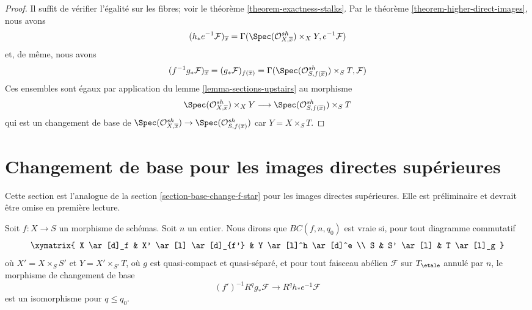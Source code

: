 \begin{proof}
Il suffit de vérifier l'égalité sur les fibres; voir le
théorème \ref{theorem-exactness-stalks}.
Par le théorème \ref{theorem-higher-direct-images}, nous avons
$$
(h_*e^{-1}\mathcal{F})_{\overline{x}} =
\Gamma(\Spec(\mathcal{O}_{X, \overline{x}}^{sh}) \times_X Y, e^{-1}\mathcal{F})
$$
et, de même, nous avons
$$
(f^{-1}g_*\mathcal{F})_{\overline{x}} =
(g_*\mathcal{F})_{f(\overline{x})} =
\Gamma(\Spec(\mathcal{O}_{S, f(\overline{x})}^{sh}) \times_S T, \mathcal{F})
$$
Ces ensembles sont égaux par application du lemme \ref{lemma-sections-upstairs}
au morphisme
$$
\Spec(\mathcal{O}_{X, \overline{x}}^{sh}) \times_X Y
\longrightarrow
\Spec(\mathcal{O}_{S, f(\overline{x})}^{sh}) \times_S T
$$
qui est un changement de base de
$\Spec(\mathcal{O}_{X, \overline{x}}^{sh}) \to
\Spec(\mathcal{O}_{S, f(\overline{x})}^{sh})$
car $Y = X \times_S T$.
\end{proof}







\section{Changement de base pour les images directes supérieures}
\label{section-base-change}

\noindent
Cette section est l'analogue de la section \ref{section-base-change-f-star}
pour les images directes supérieures.
Elle est préliminaire et devrait être omise en première lecture.

\begin{remark}
\label{remark-base-change-holds}
Soit $f : X \to S$ un morphisme de schémas. Soit $n$ un entier.
Nous dirons que $BC(f, n, q_0)$ est vraie si, pour tout diagramme commutatif
$$
\xymatrix{
X \ar[d]_f & X' \ar[l] \ar[d]_{f'} & Y \ar[l]^h \ar[d]^e \\
S & S' \ar[l] & T \ar[l]_g
}
$$
où $X' = X \times_S S'$ et $Y = X' \times_{S'} T$, où
$g$ est quasi-compact et quasi-séparé, et pour tout faisceau abélien
$\mathcal{F}$ sur $T_\etale$ annulé par $n$, le morphisme de changement de base
$$
(f')^{-1}R^qg_*\mathcal{F}
\longrightarrow
R^qh_*e^{-1}\mathcal{F}
$$
est un isomorphisme pour $q \leq q_0$.
\end{remark}

